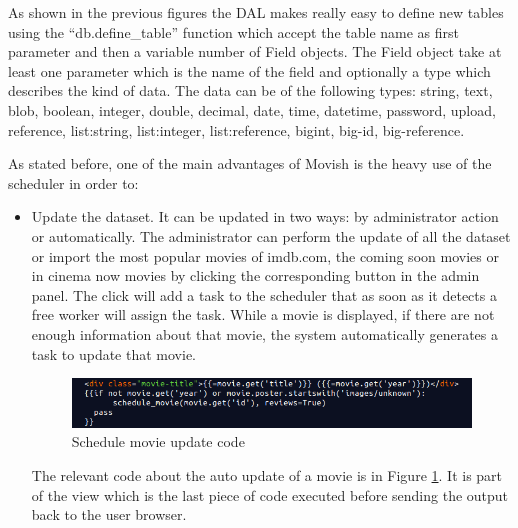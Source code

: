 As shown in the previous figures the \ac{DAL} makes really easy to define new tables using the ``db.define\_table'' function which accept the table name as first parameter and then a variable number of Field objects. The Field object take at least one parameter which is the name of the field and optionally a type which describes the kind of data. The data can be of the following types: string, text, blob, boolean, integer, double, decimal, date, time, datetime, password, upload, reference, list:string, list:integer, list:reference, bigint, big-id, big-reference.

As stated before, one of the main advantages of Movish is the heavy use of the scheduler in order to:
\begin{itemize}
\item Update the dataset. It can be updated in two ways: by administrator action or automatically. The administrator can perform the update of all the dataset or import the most popular movies of imdb.com, the coming soon movies or in cinema now movies by clicking the corresponding button in the admin panel. The click will add a task to the scheduler that as soon as it detects a free worker will assign the task. While a movie is displayed, if there are not enough information about that movie, the system automatically generates a task to update that movie. 
  \begin{figure}
    \centering
    \includegraphics[width=\textwidth]{figures/schedule_autoupdate.png}
    \caption{Schedule movie update code}
    \label{fig:schedule_update}
  \end{figure}
  The relevant code about the auto update of a movie is in Figure \ref{fig:schedule_update}. It is part of the view which is the last piece of code executed before sending the output back to the user browser. 


\end{itemize}
